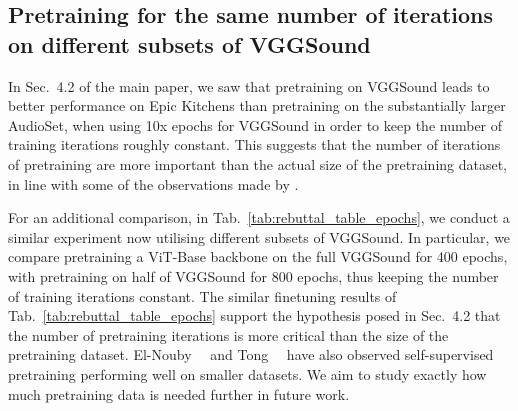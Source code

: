 \documentclass[10pt,twocolumn,letterpaper]{article}
\begin{document}
\subsection{Pretraining for the same number of iterations on different subsets of VGGSound}
In Sec.~4.2 of the main paper, we saw that pretraining on VGGSound leads to better performance on Epic Kitchens than pretraining on the substantially larger AudioSet, when using 10x epochs for VGGSound in order to keep the number of training iterations roughly constant.
This suggests that the number of iterations of pretraining are more important than the actual size of the pretraining dataset, in line with
some of the observations made by \cite{tong2022videomae}.

For an additional comparison, in Tab.~\ref{tab:rebuttal_table_epochs}, we conduct a similar experiment now utilising different subsets of VGGSound. 
In particular, we compare pretraining a ViT-Base backbone on the full VGGSound for 400 epochs, with pretraining on half of VGGSound for 800 epochs, thus keeping the number of training iterations constant.
The similar finetuning results of Tab.~\ref{tab:rebuttal_table_epochs} support the hypothesis posed in Sec.~4.2 that the number of pretraining iterations is more critical than the size of the pretraining dataset.
El-Nouby~\etal~\cite{el2021large} and Tong~\etal~\cite{tong2022videomae} have also observed self-supervised pretraining performing well on smaller datasets.
We aim to study exactly how much pretraining data is needed further in future work.
\begin{table}[t]
	\caption{Pretraining for the same number of iterations on different subsets of VGGSound produces similar finetuning results. } 
	\vspace{-0.8\baselineskip}
	\centering
	\label{tab:rebuttal_table_epochs}
\end{table} 
\end{document}
